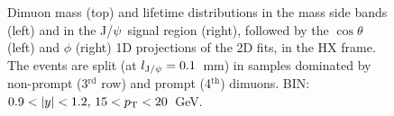 \documentclass[12pt]{article}
\newcommand{\JPsi}{J/$\psi$}
\begin{document}
\begin{figure}[htbp]
\centering
{}
\caption{Dimuon mass (top) and lifetime distributions in the mass side bands 
(left) and in the \JPsi\ signal region (right), followed by the
$\cos\theta$ (left) and $\phi$ (right) 1D projections of the 2D fits,
in the HX frame. The events are split (at $l_{{\rm J}/\psi} = 0.1$~mm) 
in samples dominated by non-prompt (3$^\mathrm{rd}$ row) and 
prompt (4$^\mathrm{th}$) dimuons. BIN: $0.9 <|y|<1.2,\, 15 < p_{\rm T} < 20$~GeV.}
\end{figure}
\clearpage

\end{document}
